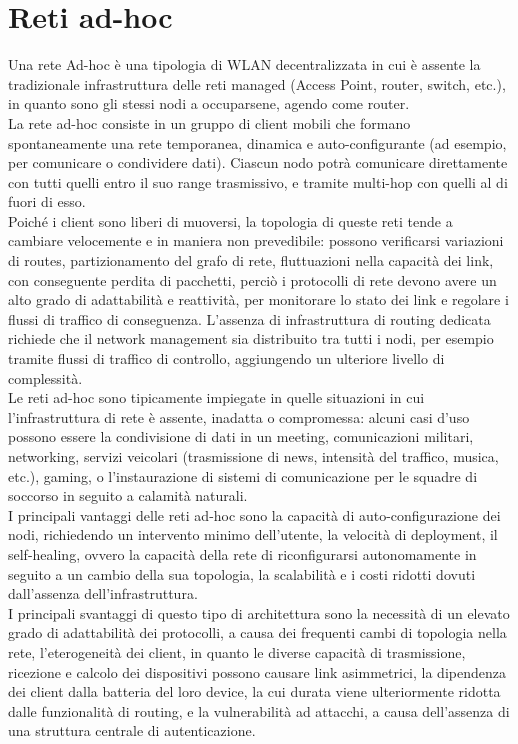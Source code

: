 \section[Reti ad-hoc]{Reti ad-hoc}
Una rete Ad-hoc è una tipologia di WLAN decentralizzata in cui è assente la tradizionale infrastruttura delle reti managed (Access Point, router, switch, etc.), in quanto sono gli stessi nodi a occuparsene, agendo come router. \\
La rete ad-hoc consiste in un gruppo di client mobili che formano spontaneamente una rete temporanea, dinamica e auto-configurante (ad esempio, per comunicare o condividere dati). 
Ciascun nodo potrà comunicare direttamente con tutti quelli entro il suo range trasmissivo, e tramite multi-hop con quelli al di fuori di esso. \\
Poiché i client sono liberi di muoversi, la topologia di queste reti tende a cambiare velocemente e in maniera non prevedibile: possono verificarsi variazioni di routes, partizionamento del grafo di rete, fluttuazioni nella capacità dei link, con conseguente perdita di pacchetti, perciò i protocolli di rete devono avere un alto grado di adattabilità e reattività, per  monitorare lo stato dei link e regolare i flussi di traffico di conseguenza.
L'assenza di infrastruttura di routing dedicata richiede che il network management sia distribuito tra tutti i nodi, per esempio tramite flussi di traffico di controllo, aggiungendo un ulteriore livello di complessità. \\
Le reti ad-hoc sono tipicamente impiegate in quelle situazioni in cui l'infrastruttura di rete è assente, inadatta o compromessa: alcuni casi d'uso possono essere la condivisione di dati in un meeting, comunicazioni militari, networking, servizi veicolari (trasmissione di news, intensità del traffico, musica, etc.), gaming, o l'instaurazione di sistemi di comunicazione per le squadre di soccorso in seguito a calamità naturali. \\
I principali vantaggi delle reti ad-hoc sono la capacità di auto-configurazione dei nodi, richiedendo un intervento minimo dell'utente, la velocità di deployment, il self-healing, ovvero la capacità della rete di riconfigurarsi autonomamente in seguito a un cambio della sua topologia, la scalabilità e i costi ridotti dovuti dall'assenza dell'infrastruttura.\\
I principali svantaggi di questo tipo di architettura sono la necessità di un elevato grado di adattabilità dei protocolli, a causa dei frequenti cambi di topologia nella rete, l'eterogeneità dei client, in quanto le diverse capacità di trasmissione, ricezione e calcolo dei dispositivi possono causare link asimmetrici, la dipendenza dei client dalla batteria del loro device, la cui durata viene ulteriormente ridotta dalle funzionalità di routing, e la vulnerabilità ad attacchi, a causa dell'assenza di una struttura centrale di autenticazione. \cite{ad hoc mobile wireless networks rounting protocols}
